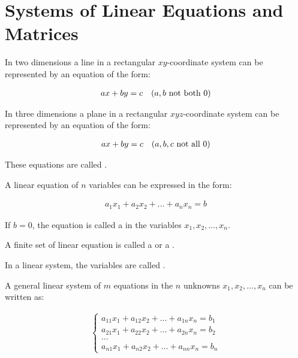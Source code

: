 \chapter{Systems of Linear Equations and Matrices}




    \par In two dimensions a line in a rectangular $xy$-coordinate system
      can be represented by an equation of the form:

    \begin{align*}
      ax + by = c \quad (a, b \mbox{ not both } 0)
    \end{align*}

    \par In three dimensions a plane in a rectangular $xyz$-coordinate
      system can be represented by an equation of the form:

    \begin{align*}
      ax + by = c \quad (a, b, c \mbox{ not all } 0)
    \end{align*}

    \par These equations are called .
    \par A linear equation of $n$ variables can be expressed in the form:

    \begin{align*}
      a_{1}x_{1} + a_{2}x_{2} + \ldots + a_{n}x_{n} = b
    \end{align*}

    \par If $b = 0$, the equation is called a  in the variables $x_{1}, x_{2}, \ldots, x_{n}$.

    \par A finite set of linear equation is called a  or a .

    \par In a linear system, the variables are called .

    \par A general linear system of $m$ equations in the $n$ unknowns
    $x_{1}, x_{2}, \ldots, x_{n}$ can be written as:

    \begin{align*}
      \begin{cases}
        a_{11}x_{1} + a_{12}x_{2} + \ldots + a_{1n}x_{n} = b_{1} \\
        a_{21}x_{1} + a_{22}x_{2} + \ldots + a_{2n}x_{n} = b_{2} \\
        \ldots \\
        a_{n1}x_{1} + a_{n2}x_{2} + \ldots + a_{nn}x_{n} = b_{n}
      \end{cases}
    \end{align*}

